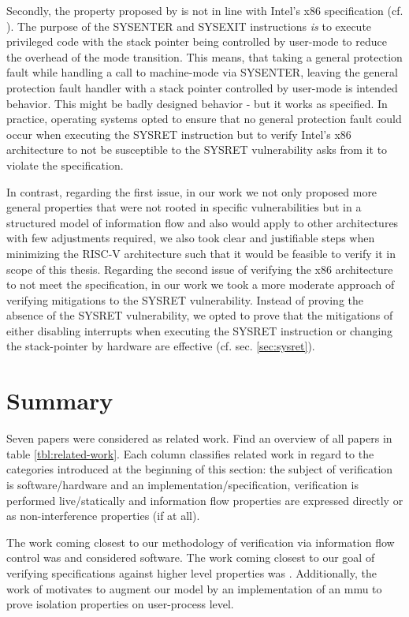 Secondly, the property proposed by \citeauthor{BradfieldS16} is not in line with Intel's x86 specification (cf. \cite{Dunlap19}).
The purpose of the SYSENTER and SYSEXIT instructions \textit{is} to execute privileged code with the stack pointer being controlled by user-mode to reduce the overhead of the mode transition.
This means, that taking a general protection fault while handling a call to machine-mode via SYSENTER, leaving the general protection fault handler with a stack pointer controlled by user-mode is intended behavior.
This might be badly designed behavior - but it works as specified.
In practice, operating systems opted to ensure that no general protection fault could occur when executing the SYSRET instruction but to verify Intel's x86 architecture to not be susceptible to the SYSRET vulnerability asks from it to violate the specification.

In contrast, regarding the first issue, in our work we not only proposed more general properties that were not rooted in specific vulnerabilities but in a structured model of information flow and also would apply to other architectures with few adjustments required, we also took clear and justifiable steps when minimizing the RISC-V architecture such that it would be feasible to verify it in scope of this thesis.
Regarding the second issue of verifying the x86 architecture to not meet the specification, in our work we took a more moderate approach of verifying mitigations to the SYSRET vulnerability.
Instead of proving the absence of the SYSRET vulnerability, we opted to prove that the mitigations of either disabling interrupts when executing the SYSRET instruction or changing the stack-pointer by hardware are effective (cf. sec. \ref{sec:sysret}).

\section{Summary}

Seven papers were considered as related work.
Find an overview of all papers in table \ref{tbl:related-work}.
Each column classifies related work in regard to the categories introduced at the beginning of this section: the subject of verification is software/hardware and an implementation/specification, verification is performed live/statically and information flow properties are expressed directly or as non-interference properties (if at all).

The work coming closest to our methodology of verification via information flow control was \cite{GordonKPGNR15,SuhLZD04} and considered software.
The work coming closest to our goal of verifying specifications against higher level properties was \cite{Fox02,KhakpourSD13,BradfieldS16}.
Additionally, the work of \cite{SuhLZD04,KhakpourSD13} motivates to augment our model by an implementation of an \gls{mmu} to prove isolation properties on user-process level.

